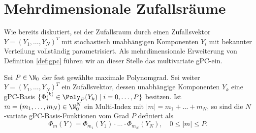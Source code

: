 \section{Mehrdimensionale Zufallsräume}
Wie bereits diskutiert, sei der Zufallsraum durch einen Zufallsvektor $Y=(Y_1,\dots,Y_N)^T$ mit stochastisch unabhängigen Komponenten $Y_i$ mit bekannter Verteilung vollständig parametrisiert. Als mehrdimensionale Erweiterung von Definition \ref{def:gpc} führen wir an dieser Stelle das multivariate gPC-ein.
\begin{mathdef}
Sei $P\in\N_0$ der fest gewählte maximale Polynomgrad. Sei weiter $Y=(Y_1,\dots,Y_N)^T$ ein Zufallsvektor, dessen unabhängige Komponenten $Y_k$ eine gPC-Basis $\lbrace \Phi_i^{(k)}\in\Poly_P(Y_k)\mid i=0,\dots,P\rbrace$ besitzen. Ist $m=(m_1,\dots,m_N)\in\N_0^N$ ein Multi-Index mit $|m|=m_1+\dots+m_N$, so sind die $N$-variate gPC-Basis-Funktionen vom Grad $P$ definiert als 
\[\Phi_m(Y)=\Phi_{m_1}(Y_1)\cdot\ldots\cdot\Phi_{m_N}(Y_N),\quad 0\le |m|\le P.\]
\end{mathdef}

